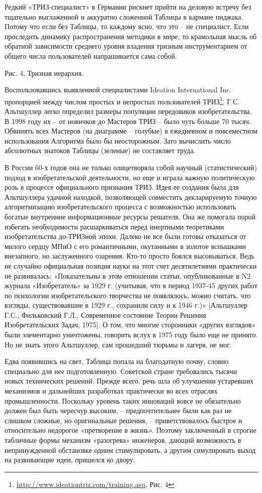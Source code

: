 \documentclass[11pt,a4paper]{article}
\begin{document}
Редкий «ТРИЗ-специалист» в Германии рискнет прийти на деловую встречу без
тщательно выглаженной и аккуратно сложенной Таблицы в кармане пиджака. Потому
что если без Таблицы, то каждому ясно, что это -- не специалист. Если
проследить динамику распространения методики в мире, то крамольная мысль об
обратной зависимости среднего уровня владения тризным инструментарием от
общего числа пользователей напрашивается сама собой.

Рис. 4, Тризная иерархия.

Воспользовавшись выявленной специалистами Ideation International
Inc. пропорцией между числом простых и непростых пользователей
ТРИЗ\footnote{\url{http://www.ideationtriz.com/training.asp}, Рис. 4},
Г.С. Альтшуллер легко определил размеры популяции передовиков
изобретательства. В 1998 году их -- от новичков до Мастеров ТРИЗ -- было чуть
больше 70 тысяч. Обвинять всех Мастеров (на диаграмме -- голубые) в ежедневном
и повсеместном использования Алгоритма было бы неосторожным. Зато вычислить
число абсолютных знатоков Таблицы (зеленые) не составляет труда.

В России 60-х годов она не только олицетворяла собой научный (статистический)
подход в изобретательской деятельности, но еще и играла важную политическую
роль в процессе официального признания ТРИЗ. Идея ее создания была для
Альтшуллера удачной находкой, позволяющей совместить декларируемую точную
алгоритмизацию изобретательского процесса с возможностью использовать богатые
внутренние информационные ресурсы решателя. Она же помогала порой избегать
необходимости расшаркиваться перед инертными теоретиками изобретательства
до-ТРИЗной эпохи. Далеко не все были готовы отказаться от милого сердцу МПиО с
его романтичными, окутанными в золотое вспышками внезапного, но заслуженного
озарения. Кто-то просто боялся высовываться. Ведь не случайно официальная
позиция науки на этот счет десятилетиями практически не развивалась:
«Показательны в этом отношении статьи, опубликованные в N2 журнала
«Изобретатель» за 1929 г. (учитывая, что в период 1937-45 других работ по
психологии изобретательского творчества не появлялось, можно считать, что
взгляды, существовавшие в 1929 г., сохранили силу и к 1946 г.)» [Альтшуллер
  Г.С., Фильковский Г.Л., Современное состояние Теории Решения
  Изобретательских Задач, 1975]. О том, что многие сторонники «других
взглядов» были элементарно уничтожены, говорить вслух в 1975 году было еще не
принято. Но не знать этого Альтшуллер, сам прошедший тюрьмы и лагеря, не мог.

Едва появившись на свет, Таблица попала на благодатную почву, словно
специально для нее подготовленную. Советской стране требовались тысячи новых
технических решений. Прежде всего, речь шла об улучшении устаревших механизмов
и дальнейших разработках практически во всех отраслях промышленности.
Поскольку уровень таких инноваций вовсе не обязательно должен был быть
чересчур высоким, -- предпочтительнее были как раз не слишком сложные, но
оригинальные решения, -- приветствовалось быстрое и относительно недорогое
«претворение в жизнь». Поэтому заключенный в строгие табличные формы механизм
«разогрева» инженеров, дающий возможность в непринужденной обстановке одним
стимулировать, а другим симулировать выход на развивающие идеи, пришелся ко
двору.
\end{document}
